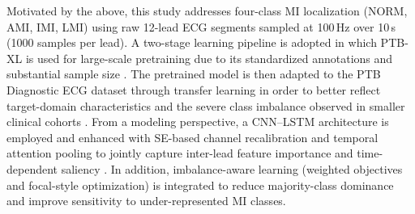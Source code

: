 \documentclass[preprint,12pt]{elsarticle}
\begin{document}
Motivated by the above, this study addresses four-class MI localization (NORM, AMI, IMI, LMI) using raw 12-lead ECG segments sampled at 100\,Hz over 10\,s (1000 samples per lead). A two-stage learning pipeline is adopted in which PTB-XL is used for large-scale pretraining due to its standardized annotations and substantial sample size \cite{Wagner2020SciData_PTBXL,StrodthoffWagnerSchaeffterSamek2021JBHI_PTBXL_Benchmarks}. The pretrained model is then adapted to the PTB Diagnostic ECG dataset through transfer learning in order to better reflect target-domain characteristics and the severe class imbalance observed in smaller clinical cohorts \cite{WeimannConrad2021SciRep_TL_ECG,ChuiGuptaZhaoMalibariAryaAlhalabiRuiz2022Bioengineering_DistantTL_ECG,NguyenDo2025PLOSone_TL_ECG_Effective}. From a modeling perspective, a CNN--LSTM architecture is employed and enhanced with SE-based channel recalibration and temporal attention pooling to jointly capture inter-lead feature importance and time-dependent saliency \cite{Sun2024Sensors_CNNLSTMSE,QuFu2025JSMU_ResLSTM_TemporalSE,LimKim2025ApplSci_SpikeCAN}. In addition, imbalance-aware learning (weighted objectives and focal-style optimization) is integrated to reduce majority-class dominance and improve sensitivity to under-represented MI classes.
\end{document}
